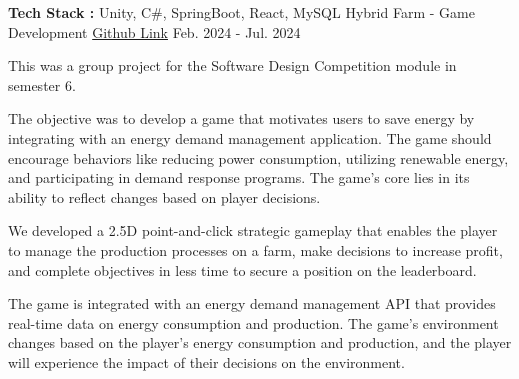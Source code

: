 


\begin{cventries}


\cventry
{\textbf{Tech Stack :} Unity, C\#, SpringBoot, React, MySQL} %
{Hybrid Farm - Game Development} %
{\href{https://github.com/Stealth-Devs-Org/Stealth-SDC-Sem6}{Github Link}} %
{Feb. 2024 - Jul. 2024} %
{ %
\begin{cvitems}
\item {This was a group project for the Software Design Competition module in semester 6.}
\item {The objective was to develop a game that motivates users to save energy by integrating with an energy demand management application. The game should encourage behaviors like reducing power consumption, utilizing renewable energy, and participating in demand response programs. The game's core lies in its ability to reflect changes based on player decisions.}
\item {We developed a 2.5D point-and-click strategic gameplay that enables the player to manage the production processes on a farm, make decisions to increase profit, and complete objectives in less time to secure a position on the leaderboard.}
\item {The game is integrated with an energy demand management API that provides real-time data on energy consumption and production. The game's environment changes based on the player's energy consumption and production, and the player will experience the impact of their decisions on the environment.}
\end{cvitems}
}



\end{cventries}
